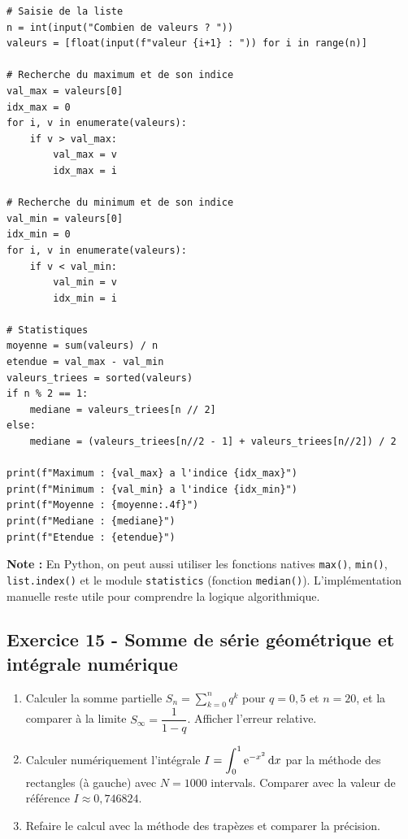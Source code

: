 \documentclass[12pt,a4paper]{article}
\begin{document}
\begin{boitecorrige}
\begin{lstlisting}
# Saisie de la liste
n = int(input("Combien de valeurs ? "))
valeurs = [float(input(f"valeur {i+1} : ")) for i in range(n)]

# Recherche du maximum et de son indice
val_max = valeurs[0]
idx_max = 0
for i, v in enumerate(valeurs):
    if v > val_max:
        val_max = v
        idx_max = i

# Recherche du minimum et de son indice
val_min = valeurs[0]
idx_min = 0
for i, v in enumerate(valeurs):
    if v < val_min:
        val_min = v
        idx_min = i

# Statistiques
moyenne = sum(valeurs) / n
etendue = val_max - val_min
valeurs_triees = sorted(valeurs)
if n % 2 == 1:
    mediane = valeurs_triees[n // 2]
else:
    mediane = (valeurs_triees[n//2 - 1] + valeurs_triees[n//2]) / 2

print(f"Maximum : {val_max} a l'indice {idx_max}")
print(f"Minimum : {val_min} a l'indice {idx_min}")
print(f"Moyenne : {moyenne:.4f}")
print(f"Mediane : {mediane}")
print(f"Etendue : {etendue}")
\end{lstlisting}

\textbf{Note :} En Python, on peut aussi utiliser les fonctions natives \texttt{max()}, \texttt{min()}, \texttt{list.index()} et le module \texttt{statistics} (fonction \texttt{median()}). L'implémentation manuelle reste utile pour comprendre la logique algorithmique.
\end{boitecorrige}

\subsection*{Exercice 15 - Somme de série géométrique et intégrale numérique \niveau{\moyen}}

\begin{boiteexercice}
\begin{enumerate}
  \item Calculer la somme partielle $S_n = \displaystyle\sum_{k=0}^{n} q^k$ pour $q = 0{,}5$ et $n = 20$, et la comparer à la limite $S_\infty = \dfrac{1}{1-q}$. Afficher l'erreur relative.
  \item Calculer numériquement l'intégrale $I = \displaystyle\int_0^1 \mathrm{e}^{-x^2}\,\mathrm{d}x$ par la méthode des rectangles (à gauche) avec $N = 1000$ intervals. Comparer avec la valeur de référence $I \approx 0{,}746824$.
  \item Refaire le calcul avec la méthode des trapèzes et comparer la précision.
\end{enumerate}
\end{boiteexercice}
\end{document}
